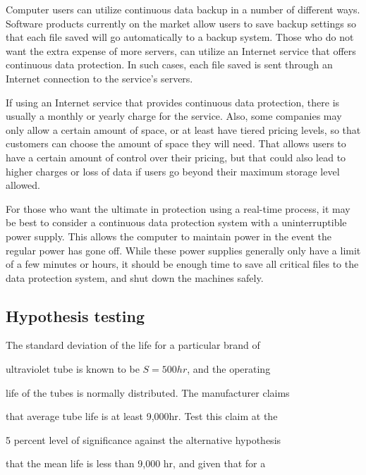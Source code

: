  

Computer users can utilize continuous data backup in a number of different ways. Software products currently on the market allow users to save backup settings so that each file saved will go automatically to a backup system. Those who do not want the extra expense of more servers, can utilize an Internet service that offers continuous data protection. In such cases, each file saved is sent through an Internet connection to the service's servers.

 

If using an Internet service that provides continuous data protection, there is usually a monthly or yearly charge for the service. Also, some companies may only allow a certain amount of space, or at least have tiered pricing levels, so that customers can choose the amount of space they will need. That allows users to have a certain amount of control over their pricing, but that could also lead to higher charges or loss of data if users go beyond their maximum storage level allowed.

 

For those who want the ultimate in protection using a real-time process, it may be best to consider a continuous data protection system with a uninterruptible power supply. This allows the computer to maintain power in the event the regular power has gone off. While these power supplies generally only have a limit of a few minutes or hours, it should be enough time to save all critical files to the data protection system, and shut down the machines safely.

 



\subsection{Hypothesis testing}

The standard deviation of the life for a particular brand of

ultraviolet tube is known to be $S = 500 hr$, and the operating

life of the tubes is normally distributed. The manufacturer claims

that average tube life is at least 9,000hr. Test this claim at the

5 percent level of significance against the alternative hypothesis

that the mean life is less than 9,000 hr, and given that for a


